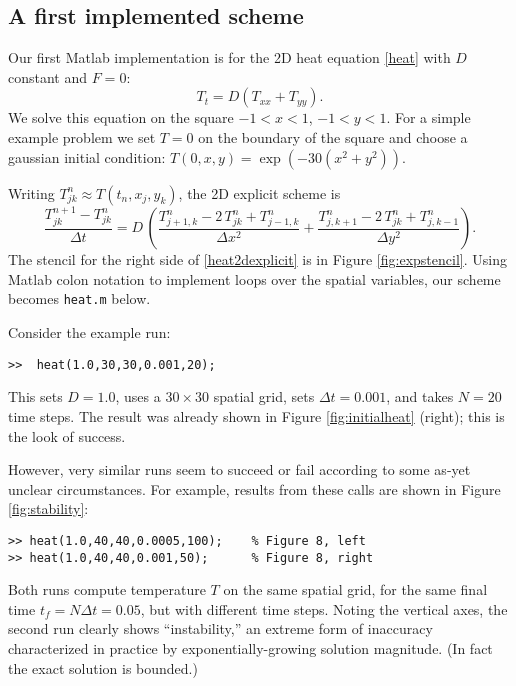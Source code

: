 \documentclass[letterpaper,final,12pt,reqno]{amsart}
\newcommand{\minput}[1]{
\vspace{0.8cm}
\VerbatimInput[frame=single,framesep=3mm,label=\fbox{\normalsize \textsl{\,#1.m\,}},fontfamily=courier,fontsize=\footnotesize]{tmp/#1.slim.m}
\vspace{0.5cm}
}
\begin{document}
\subsection*{A first implemented scheme}  Our first Matlab implementation is for the 2D heat equation \eqref{heat} with $D$ constant and $F=0$:
\begin{equation}
T_t = D (T_{xx}+T_{yy}).\label{heat2D}
\end{equation}
We solve this equation on the square $-1 < x < 1$, $-1 < y < 1$.  For a simple example problem we set $T=0$ on the boundary of the square and choose a gaussian initial condition: $T(0,x,y) = \exp(-30 (x^2+y^2))$.

Writing $T_{jk}^n \approx T(t_n,x_j,y_k)$, the 2D explicit scheme is
\begin{equation}
	\frac{T_{jk}^{n+1} - T_{jk}^n}{\Delta t} = D\,\left(\frac{T_{j+1,k}^n - 2\, T_{jk}^n + T_{j-1,k}^n}{\Delta x^2} + \frac{T_{j,k+1}^n - 2\, T_{jk}^n + T_{j,k-1}^n}{\Delta y^2}\right). \label{heat2dexplicit}
\end{equation}
The stencil for the right side of \eqref{heat2dexplicit} is in Figure \ref{fig:expstencil}.  Using Matlab colon notation to implement loops over the spatial variables, our scheme becomes \texttt{heat.m} below.  

Consider the example run:
\begin{Verbatim}
>>  heat(1.0,30,30,0.001,20);
\end{Verbatim}
This sets $D=1.0$, uses a $30\times 30$ spatial grid, sets $\Delta t = 0.001$, and takes $N=20$ time steps.  The result was already shown in Figure \ref{fig:initialheat} (right); this is the look of success.

\minput{heat}

However, very similar runs seem to succeed or fail according to some as-yet unclear circumstances.  For example, results from these calls are shown in Figure \ref{fig:stability}:
\begin{Verbatim}
>> heat(1.0,40,40,0.0005,100);    % Figure 8, left
>> heat(1.0,40,40,0.001,50);      % Figure 8, right
\end{Verbatim}
Both runs compute temperature $T$ on the same spatial grid, for the same final time $t_f = N \Delta t = 0.05$, but with different time steps.  Noting the vertical axes, the second run clearly shows ``instability,'' an extreme form of inaccuracy characterized in practice by exponentially-growing solution magnitude.  (In fact the exact solution is bounded.)
\end{document}
